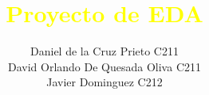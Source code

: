 \documentclass{article}
\begin{document}
    \title{\textcolor{yellow}{\textbf{Proyecto de EDA}}\\}
    \author{Daniel de la Cruz Prieto C211\\ David Orlando De Quesada Oliva C211\\Javier Dominguez C212} 
    \date{}
    \maketitle
\end{document}
